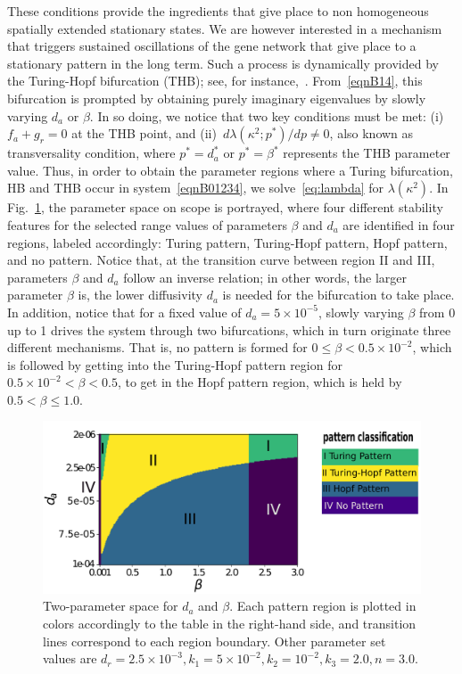 \documentclass[%
 preprint,
 amsmath,amssymb,
 aps,
]{revtex4-2}
\begin{document}
These conditions provide the ingredients that give place to non homogeneous spatially extended stationary states. We are however interested in a mechanism that triggers sustained oscillations of the gene network that give place to a stationary pattern in the long term. Such a process is dynamically provided by the Turing-Hopf bifurcation (THB); see, for instance,~\citep{Castillo2016, liu}. From~\eqref{eqnB14}, this bifurcation is prompted by obtaining purely imaginary eigenvalues by slowly varying $d_a$ or $\beta$. In so doing, we notice that two key conditions must be met: (i)~$f_a + g_r=0$ at the THB point, and (ii)~$d\lambda(\kappa^2;p^*)/dp\neq0$, also known as transversality condition, where $p^*=d_a^*$ or $p^*=\beta^*$ represents the THB parameter value. Thus, in order to obtain the parameter regions where a Turing bifurcation, HB and THB occur in system~\eqref{eqnB01234}, we solve~\eqref{eq:lambda} for $\lambda(\kappa^2)$. In Fig.~\ref{FigB01}, the parameter space on scope is portrayed, where four different stability features for the selected range values of parameters $\beta$ and $d_a$ are identified in four regions, labeled accordingly: Turing pattern, Turing-Hopf pattern, Hopf pattern, and no pattern. Notice that, at the transition curve between region II and III, parameters $\beta$ and $d_a$ follow an inverse relation; in other words, the larger parameter $\beta$ is, the lower diffusivity $d_a$ is needed for the bifurcation to take place. In addition, notice that for a fixed value of $d_a=5\times10^{-5}$, slowly varying $\beta$ from 0 up to 1 drives the system through two bifurcations, which in turn originate three different mechanisms. That is, no pattern is formed for $0\leq\beta < 0.5\times10^{-2}$, which is followed by getting into the Turing-Hopf pattern region for $ 0.5\times10^{-2}<\beta<0.5$, to get in the Hopf pattern region, which is held by $ 0.5<\beta\leq 1.0$. 

\begin{figure}[t!]
	\centering
	\includegraphics[width=5.0in]{Figures/ApFigure01}
	\caption{Two-parameter space for $d_a$ and $\beta$. Each pattern region is plotted in colors accordingly to the table in the right-hand side, and transition lines correspond to each region boundary. Other parameter set values are $d_r = 2.5\times10^{-3}, k_1 = 5\times10^{-2}, k_2=10^{-2}, k_3=2.0, n=3.0$.}
	\label{FigB01}
\end{figure}
\end{document}
